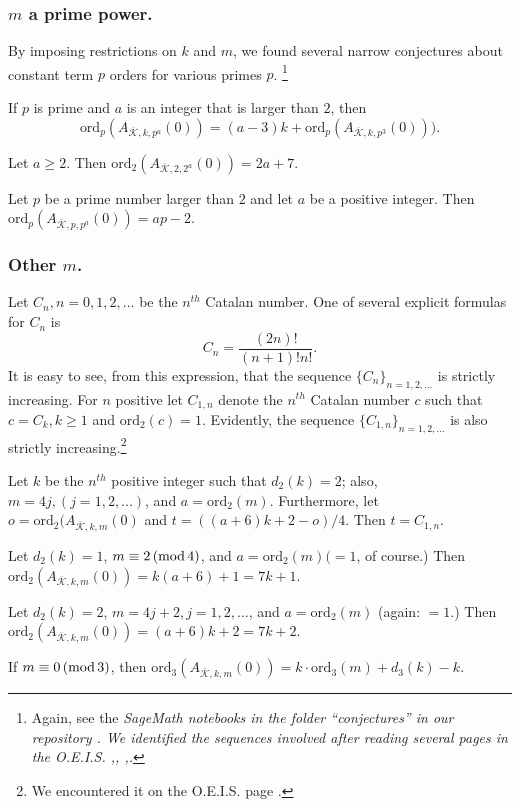 \documentclass{article}
\begin{document}
\subsubsection[]{$m$ a prime power.}
By imposing 
restrictions on $k$ and $m$,
we found several narrow
conjectures  about constant term $p$ orders 
for various primes $p$.
\footnote{Again, see
the \it SageMath \rm
notebooks
in the folder ``conjectures''
in our repository
\cite{githubNewmanShanks}.
We identified the sequences 
involved after reading several pages in the O.E.I.S. 
\cite{OEISturpel},\cite{OEISgerasimov},
\cite{OEISsloane},\cite{OEISzum}.}
\begin{conjecture}
If $p$ is prime
and $a$ is an integer that is 
larger than $2$,
then
$$\text{ord}_p(A_{\overline{\mathcal{K}},k,p^a}(0)) 
=(a-3)k+
\text{ord}_p(A_{\overline{\mathcal{K}},k,p^3}(0))).
$$
\end{conjecture}
\begin{conjecture}
Let $a \geq 2$. Then
$\text{ord}_2(A_{\overline{\mathcal{K}},
2,2^a}(0)) = 2a+7$.
\end{conjecture}
\begin{conjecture}
Let $p$ be a prime number larger than $2$
and let $a$ be a positive integer. Then
$\text{ord}_p(A_{\overline{\mathcal{K}},p,p^a}(0))
= ap-2$.
\end{conjecture} \noindent
\subsubsection[]{Other $m$.}
Let $C_n, n = 0, 1, 2, ...$ be 
the $n^{th}$ Catalan number. 
One of several explicit formulas 
for $C_n$ is $$C_n = 
\frac{(2n)!}{(n+1)!n!}.$$ \noindent
It is easy to see, from this expression, 
that the sequence 
$\{C_n\}_{n = 1, 2, ...}$ is 
strictly increasing. For $n$ positive
let  $C_{1,n}$ denote the $n^{th}$ 
Catalan number $c$ such that $c =C_k, k \geq 1$
 and $\text{ord}_2(c) = 1$. Evidently,
 the sequence $\{C_{1,n}\}_{n = 1, 2, ...}$
 is also strictly increasing.\footnote{We 
 encountered 
 it on the O.E.I.S. page 
\cite{OEISbottomley}.}
\begin{conjecture}
Let 
$k$ be the $n^{th}$ positive integer
such that
$d_2(k) = 2$; also,
$m = 4j, (j = 1, 2,...)$,
and
$a = \text{ord}_2(m)$.
Furthermore, let
$o = \text{ord}_2 (A_{\overline{\mathcal{K}},k,m}(0)$ and 
$ t = ((a+6)k +2 - o)/4$.
Then 
$t = C_{1,n}$.
\end{conjecture}
\begin{conjecture} 
Let $d_2(k) = 1$,
$m \equiv 2 \thinspace 
(\text{mod} \thinspace 4)$,
and $a=\text{ord}_2(m) ( = 1$,
of course.)
Then 
$\text{ord}_2 (A_{\overline{\mathcal{K}},k,m}(0)) =
k(a+6) + 1 = 7k + 1$.
\end{conjecture}
\begin{conjecture}
Let  $d_2(k) = 2$,
$m = 4j + 2, j = 1, 2, ...$, and 
$a = \text{ord}_2(m)$ (again: $ = 1$.)
Then
$\text{ord}_2 (A_{\overline{\mathcal{K}},k,m}(0)) = (a+6)k+2
= 7k + 2$.
\end{conjecture}
\begin{conjecture} If
$m \equiv 0 \thinspace 
(\text{mod} \thinspace 3)$,
then $\text{ord}_3 (A_{\overline{\mathcal{K}},k,m}(0))=
k \cdot \text{ord}_3(m) + d_3(k) - k.$
\end{conjecture}
\end{document}
